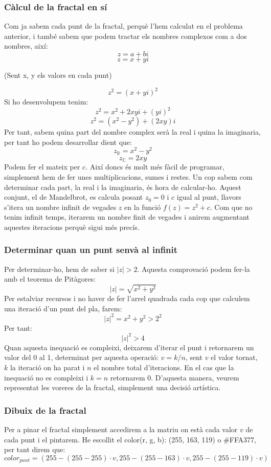 \subsubsection{Càlcul de la fractal en sí}
Com ja sabem cada punt de la fractal, perquè l'hem calculat en el problema anterior, i també sabem que podem tractar els nombres complexos com a dos nombres, així:
\[z = a + bi\]
\[z = x + yi\]
\centerline{(Sent x, y els valors en cada punt)}
\[z^2 = (x + yi)^2\]
Si ho desenvolupem tenim:
\[z^2 = x^2 + 2xyi + (yi)^2\]
\[z^2 = (x^2 - y^2) + (2xy)i\]
Per tant, sabem quina part del nombre complex serà la real i quina la imaginaria, per tant ho podem desarrollar dient que:
\[z_\mathbb{R} = x^2 - y^2\]
\[z_\mathbb{C} = 2xy\]
Podem fer el mateix per $c$. \n
Així doncs és molt més fàcil de programar, simplement hem de fer unes multiplicacions, sumes i restes. \n
Un cop sabem com determinar cada part, la real i la imaginaria, és hora de calcular-ho. Aquest conjunt, el de Mandelbrot, es calcula posant $z_0 = 0$ i $c$ igual al punt, llavors s'itera un nombre infinit de vegades $z$ en la funció $f(z) = z^2 + c$. Com que no tenim infinit temps, iterarem un nombre finit de vegades i anirem augmentant aquestes iteracions perquè sigui més precís.
\subsubsection*{Determinar quan un punt senvà al infinit}
Per determinar-ho, hem de saber si $|z| > 2$. Aquesta comprovació podem fer-la amb el teorema de Pitàgores:
\[|z| = \sqrt{x^2 + y^2}\]
Per estalviar recursos i no haver de fer l'arrel quadrada cada cop que calculem una iteració d'un punt del pla, farem:
\[|z|^2 = x^2 + y^2 > 2^2\]
Per tant:
\[|z|^2 > 4\]
Quan aquesta inequació es compleixi, deixarem d'iterar el punt i retornarem un valor del 0 al 1, determinat per aquesta operació: $v = k / n$, sent $v$ el valor tornat, $k$ la iteració on ha parat i $n$ el nombre total d'iteracions.\n
En el cas que la inequació no es compleixi i $k = n$ retornarem 0. \n
D'aquesta manera, veurem representat les voreres de la fractal, simplement una decisió artística.
\subsubsection{Dibuix de la fractal}
Per a pinar el fractal simplement accedirem a la matriu on està cada valor $v$ de cada punt i el pintarem. He escollit el color(r, g, b): (255, 163, 119) o \#FFA377, per tant direm que:
\[color_{punt} = (255 - (255 - 255) \cdot v, 255 - (255 - 163) \cdot v, 255 - (255 - 119) \cdot v)\]
